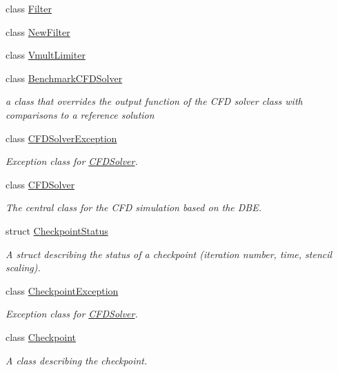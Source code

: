 \begin{DoxyCompactItemize}
class \hyperlink{classnatrium_1_1Filter}{Filter}
\item 
class \hyperlink{classnatrium_1_1NewFilter}{NewFilter}
\item 
class \hyperlink{classnatrium_1_1VmultLimiter}{VmultLimiter}
\item 
class \hyperlink{classnatrium_1_1BenchmarkCFDSolver}{BenchmarkCFDSolver}
\begin{DoxyCompactList}\small\item\em a class that overrides the output function of the CFD solver class with comparisons to a reference solution \item\end{DoxyCompactList}\item 
class \hyperlink{classnatrium_1_1CFDSolverException}{CFDSolverException}
\begin{DoxyCompactList}\small\item\em Exception class for \hyperlink{classnatrium_1_1CFDSolver}{CFDSolver}. \item\end{DoxyCompactList}\item 
class \hyperlink{classnatrium_1_1CFDSolver}{CFDSolver}
\begin{DoxyCompactList}\small\item\em The central class for the CFD simulation based on the DBE. \item\end{DoxyCompactList}\item 
struct \hyperlink{structnatrium_1_1CheckpointStatus}{CheckpointStatus}
\begin{DoxyCompactList}\small\item\em A struct describing the status of a checkpoint (iteration number, time, stencil scaling). \item\end{DoxyCompactList}\item 
class \hyperlink{classnatrium_1_1CheckpointException}{CheckpointException}
\begin{DoxyCompactList}\small\item\em Exception class for \hyperlink{classnatrium_1_1CFDSolver}{CFDSolver}. \item\end{DoxyCompactList}\item 
class \hyperlink{classnatrium_1_1Checkpoint}{Checkpoint}
\begin{DoxyCompactList}\small\item\em A class describing the checkpoint. \item\end{DoxyCompactList}\item 

\end{DoxyCompactItemize}
